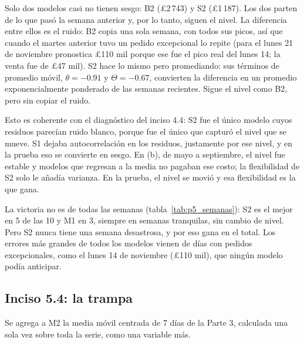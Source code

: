 Solo dos modelos casi no tienen sesgo: B2 (\pounds2\,743) y S2
(\pounds1\,187). Los dos parten de lo que pasó la semana anterior y, por lo
tanto, siguen el nivel. La diferencia entre ellos es el ruido: B2 copia una
sola semana, con todos sus picos, así que cuando el martes anterior tuvo un
pedido excepcional lo repite (para el lunes 21 de noviembre pronostica
\pounds110 mil porque ese fue el pico real del lunes 14; la venta fue de
\pounds47 mil). S2 hace lo mismo pero promediando: sus
términos de promedio móvil, $\theta=-0.91$ y $\Theta=-0.67$, convierten la
diferencia en un promedio exponencialmente ponderado de las semanas
recientes. Sigue el nivel como B2, pero sin copiar el ruido.

Esto es coherente con el diagnóstico del inciso 4.4: S2 fue el único modelo
cuyos residuos parecían ruido blanco, porque fue el único que capturó el
nivel que se mueve. S1 dejaba autocorrelación en los residuos, justamente por
ese nivel, y en la prueba eso se convierte en sesgo. En (b), de mayo a
septiembre, el nivel fue estable y modelos que regresan a la media no pagaban
ese costo; la flexibilidad de S2 solo le añadía varianza. En la prueba, el
nivel se movió y esa flexibilidad es la que gana.

\begin{table}[H]
  \centering
  \small
  \caption{MAE de cada semana de la prueba, en miles de libras. ``Mejor'' es
  el modelo con menor MAE esa semana.}
  \label{tab:p5_semanas}
\end{table}

La victoria no es de todas las semanas (tabla~\ref{tab:p5_semanas}): S2 es el
mejor en 5 de las 10 y M1 en 3, siempre en semanas tranquilas, sin cambio de
nivel. Pero S2 nunca tiene una semana desastrosa, y por eso gana en el total.
Los errores más grandes de todos los modelos vienen de días con pedidos
excepcionales, como el lunes 14 de noviembre (\pounds110 mil), que ningún
modelo podía anticipar.

\subsection{Inciso 5.4: la trampa}

Se agrega a M2 la media móvil centrada de 7 días de la Parte 3, calculada una
sola vez sobre toda la serie, como una variable más.

\begin{table}[H]
  \centering
  \small
  \caption{M2 con y sin la media móvil centrada como predictor. (a):
  promedio sobre 10 semillas; (b): origen móvil en el entrenamiento.}
  \label{tab:p5_trampa}
\end{table}

